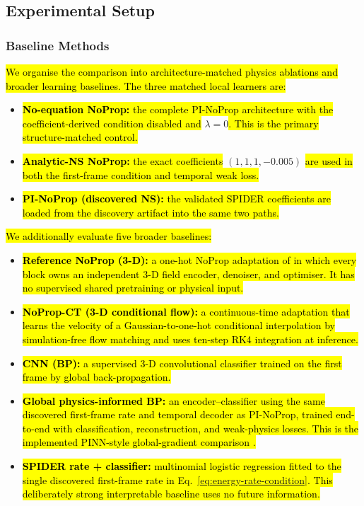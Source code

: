 \documentclass[preprint,12pt]{elsarticle}
\newcommand{\rev}[1]{\hl{#1}}
\newcommand{\revmath}[1]{\colorbox{yellow!25}{$#1$}}
\begin{document}
\subsection{Experimental Setup}
\label{sec:setup}

\subsubsection{Baseline Methods}
\label{sec:baselines}

\rev{We organise the comparison into architecture-matched physics ablations and broader learning baselines. The three matched local learners are:}

\begin{itemize}
    \item \rev{\textbf{No-equation NoProp:} the complete PI-NoProp architecture with the coefficient-derived condition disabled and }\revmath{\lambda=0}\rev{. This is the primary structure-matched control.}
    \item \rev{\textbf{Analytic-NS NoProp:} the exact coefficients }\revmath{(1,1,1,-0.005)}\rev{ are used in both the first-frame condition and temporal weak loss.}
    \item \rev{\textbf{PI-NoProp (discovered NS):} the validated SPIDER coefficients are loaded from the discovery artifact into the same two paths.}
\end{itemize}

\rev{We additionally evaluate five broader baselines:}
\begin{itemize}
    \item \rev{\textbf{Reference NoProp (3-D):} a one-hot NoProp adaptation of \cite{li2025noprop} in which every block owns an independent 3-D field encoder, denoiser, and optimiser. It has no supervised shared pretraining or physical input.}
    \item \rev{\textbf{NoProp-CT (3-D conditional flow):} a continuous-time adaptation that learns the velocity of a Gaussian-to-one-hot conditional interpolation by simulation-free flow matching and uses ten-step RK4 integration at inference.}
    \item \rev{\textbf{CNN (BP):} a supervised 3-D convolutional classifier trained on the first frame by global back-propagation.}
    \item \rev{\textbf{Global physics-informed BP:} an encoder--classifier using the same discovered first-frame rate and temporal decoder as PI-NoProp, trained end-to-end with classification, reconstruction, and weak-physics losses. This is the implemented PINN-style global-gradient comparison \cite{raissi2019physics}.}
    \item \rev{\textbf{SPIDER rate + classifier:} multinomial logistic regression fitted to the single discovered first-frame rate in Eq.~\eqref{eq:energy-rate-condition}. This deliberately strong interpretable baseline uses no future information.}
\end{itemize}
\end{document}
